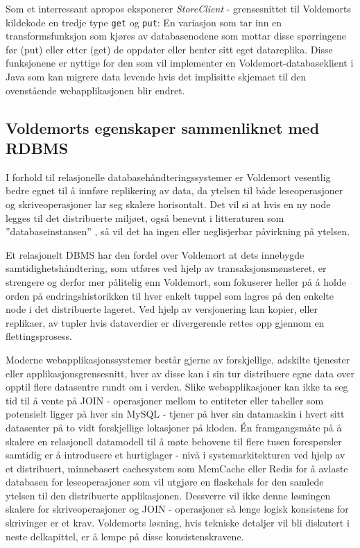 Som et interressant apropos eksponerer \emph{StoreClient} - grensesnittet til Voldemorts kildekode en tredje type \texttt{get} og \texttt{put}: En variasjon som tar inn en transformsfunksjon som kjøres av databasenodene som mottar disse spørringene før (put) eller etter (get) de oppdater eller henter sitt eget datareplika. Disse funksjonene er nyttige for den som vil implementer en Voldemort-databaseklient i Java som kan migrere data levende hvis det implisitte skjemaet til den ovenstående webapplikasjonen blir endret.

\subsection{Voldemorts egenskaper sammenliknet med RDBMS}
I forhold til relasjonelle databasehåndteringssystemer er Voldemort vesentlig bedre egnet til å innføre replikering av data, da ytelsen til både leseoperasjoner og skriveoperasjoner lar seg skalere horisontalt. Det vil si at hvis en ny node legges til det distribuerte miljøet, også benevnt i litteraturen som ''databaseinstansen'' \citep{sadalage2013}, så vil det ha ingen eller neglisjerbar påvirkning på ytelsen. 

Et relasjonelt DBMS har den fordel over Voldemort at dets innebygde samtidighetshåndtering, som utføres ved hjelp av transaksjonsmønsteret, er strengere og derfor mer pålitelig enn Voldemort, som fokuserer heller på å holde orden på endringshistorikken til hver enkelt tuppel som lagres på den enkelte node i det distribuerte lageret. Ved hjelp av versjonering kan kopier, eller replikaer, av tupler hvis dataverdier er divergerende rettes opp gjennom en flettingsprosess.

Moderne webapplikasjonssystemer består gjerne av forskjellige, adskilte tjenester eller applikasjonsgrensesnitt, hver av disse kan i sin tur distribuere egne data over opptil flere datasentre rundt om i verden. Slike webapplikasjoner kan ikke ta seg tid til å vente på JOIN - operasjoner mellom to entiteter eller tabeller som potensielt ligger på hver sin MySQL - tjener på hver sin datamaskin i hvert sitt datasenter på to vidt forskjellige lokasjoner på kloden. Én framgangsmåte på å skalere en relasjonell datamodell til å møte behovene til flere tusen forespørsler samtidig er å introdusere et hurtiglager - nivå i systemarkitekturen ved hjelp av et distribuert, minnebasert cachesystem som MemCache eller Redis for å avlaste databasen for leseoperasjoner som vil utgjøre en flaskehals for den samlede ytelsen til den distribuerte applikasjonen. Dessverre vil ikke denne løsningen skalere for skriveoperasjoner og JOIN - operasjoner så lenge logisk konsistens for skrivinger er et krav. Voldemorts løsning, hvis tekniske detaljer vil bli diskutert i neste delkapittel, er å lempe på disse konsistenskravene.

